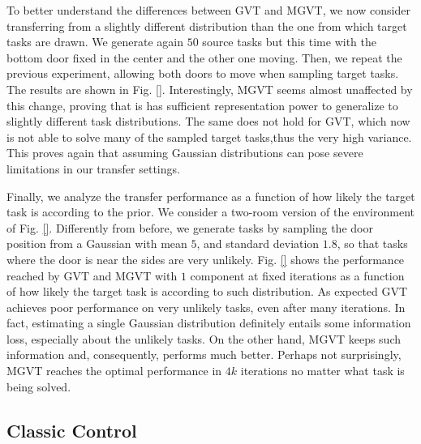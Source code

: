 \documentclass{article}
\begin{document}
To better understand the differences between GVT and MGVT, we now consider transferring from a slightly different distribution than the one from which target tasks are drawn. We generate again $50$ source tasks but this time with the bottom door fixed in the center and the other one moving. Then, we repeat the previous experiment, allowing both doors to move when sampling target tasks. The results are shown in Fig. \ref{}. Interestingly, MGVT seems almost unaffected by this change, proving that is has sufficient representation power to generalize to slightly different task distributions. The same does not hold for GVT, which now is not able to solve many of the sampled target tasks,thus the very high variance. This proves again that assuming Gaussian distributions can pose severe limitations in our transfer settings.

Finally, we analyze the transfer performance as a function of how likely the target task is according to the prior. We consider a two-room version of the environment of Fig. \ref{}. Differently from before, we generate tasks by sampling the door position from a Gaussian with mean $5$, and standard deviation $1.8$, so that tasks where the door is near the sides are very unlikely. Fig. \ref{} shows the performance reached by GVT and MGVT with $1$ component at fixed iterations as a function of how likely the target task is according to such distribution. As expected GVT achieves poor performance on very unlikely tasks, even after many iterations. In fact, estimating a single Gaussian distribution definitely entails some information loss, especially about the unlikely tasks. On the other hand, MGVT keeps such information and, consequently, performs much better. Perhaps not surprisingly, MGVT reaches the optimal performance in $4k$ iterations no matter what task is being solved.

\subsection{Classic Control} \label{sec:cc}
\end{document}
